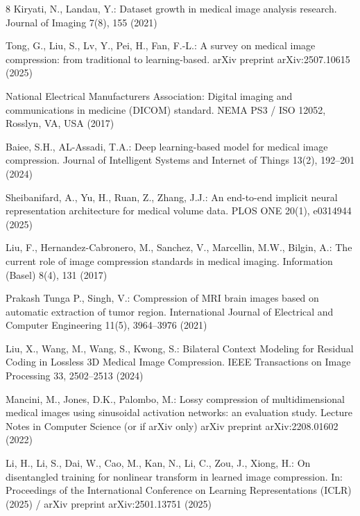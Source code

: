 \documentclass[runningheads]{llncs}
\begin{document}
%
%
%
% 
% 
%
\begin{thebibliography}{8}
Kiryati, N., Landau, Y.: Dataset growth in medical image analysis research. Journal of Imaging 7(8), 155 (2021)

Tong, G., Liu, S., Lv, Y., Pei, H., Fan, F.-L.: A survey on medical image compression: from traditional to learning-based. arXiv preprint arXiv:2507.10615 (2025)

National Electrical Manufacturers Association: Digital imaging and communications in medicine (DICOM) standard. NEMA PS3 / ISO 12052, Rosslyn, VA, USA (2017)

Baiee, S.H., AL-Assadi, T.A.: Deep learning-based model for medical image compression. Journal of Intelligent Systems and Internet of Things 13(2), 192–201 (2024) 

Sheibanifard, A., Yu, H., Ruan, Z., Zhang, J.J.: An end-to-end implicit neural representation architecture for medical volume data. PLOS ONE 20(1), e0314944 (2025) 

Liu, F., Hernandez-Cabronero, M., Sanchez, V., Marcellin, M.W., Bilgin, A.: The current role of image compression standards in medical imaging. Information (Basel) 8(4), 131 (2017)

Prakash Tunga P., Singh, V.: Compression of MRI brain images based on automatic extraction of tumor region. International Journal of Electrical and Computer Engineering 11(5), 3964–3976 (2021)

Liu, X., Wang, M., Wang, S., Kwong, S.: Bilateral Context Modeling for Residual Coding in Lossless 3D Medical Image Compression. IEEE Transactions on Image Processing 33, 2502–2513 (2024) 

Mancini, M., Jones, D.K., Palombo, M.: Lossy compression of multidimensional medical images using sinusoidal activation networks: an evaluation study. Lecture Notes in Computer Science (or if arXiv only) arXiv preprint arXiv:2208.01602 (2022)

Li, H., Li, S., Dai, W., Cao, M., Kan, N., Li, C., Zou, J., Xiong, H.: On disentangled training for nonlinear transform in learned image compression. In: Proceedings of the International Conference on Learning Representations (ICLR) (2025) / arXiv preprint arXiv:2501.13751 (2025)


\end{thebibliography}
\end{document}
